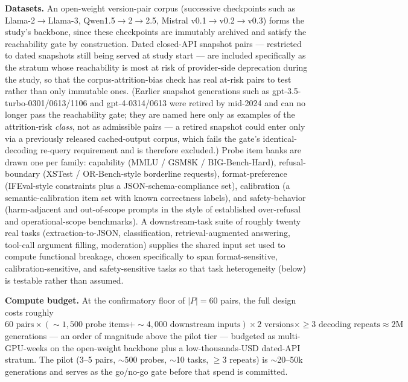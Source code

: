 \documentclass[11pt]{article}
\begin{document}
\textbf{Datasets.} An open-weight version-pair corpus (successive checkpoints such as Llama-2$\to$Llama-3, Qwen1.5$\to$2$\to$2.5, Mistral v0.1$\to$v0.2$\to$v0.3) forms the study's backbone, since these checkpoints are immutably archived and satisfy the reachability gate by construction. Dated closed-API snapshot pairs --- restricted to dated snapshots still being served at study start --- are included specifically as the stratum whose reachability is most at risk of provider-side deprecation during the study, so that the corpus-attrition-bias check has real at-risk pairs to test rather than only immutable ones. (Earlier snapshot generations such as gpt-3.5-turbo-0301/0613/1106 and gpt-4-0314/0613 were retired by mid-2024 and can no longer pass the reachability gate; they are named here only as examples of the attrition-risk \emph{class}, not as admissible pairs --- a retired snapshot could enter only via a previously released cached-output corpus, which fails the gate's identical-decoding re-query requirement and is therefore excluded.) Probe item banks are drawn one per family: capability (MMLU / GSM8K / BIG-Bench-Hard), refusal-boundary (XSTest / OR-Bench-style borderline requests), format-preference (IFEval-style constraints plus a JSON-schema-compliance set), calibration (a semantic-calibration item set with known correctness labels), and safety-behavior (harm-adjacent and out-of-scope prompts in the style of established over-refusal and operational-scope benchmarks). A downstream-task suite of roughly twenty real tasks (extraction-to-JSON, classification, retrieval-augmented answering, tool-call argument filling, moderation) supplies the shared input set used to compute functional breakage, chosen specifically to span format-sensitive, calibration-sensitive, and safety-sensitive tasks so that task heterogeneity (below) is testable rather than assumed.

\textbf{Compute budget.} At the confirmatory floor of $|P| = 60$ pairs, the full design costs roughly $60 \text{ pairs} \times (\sim\!1{,}500 \text{ probe items} + \sim\!4{,}000 \text{ downstream inputs}) \times 2 \text{ versions} \times \geq\!3 \text{ decoding repeats} \approx 2\text{M}$ generations --- an order of magnitude above the pilot tier --- budgeted as multi-GPU-weeks on the open-weight backbone plus a low-thousands-USD dated-API stratum. The pilot (3--5 pairs, $\sim$500 probes, $\sim$10 tasks, $\geq$3 repeats) is $\sim$20--50k generations and serves as the go/no-go gate before that spend is committed.
\end{document}
